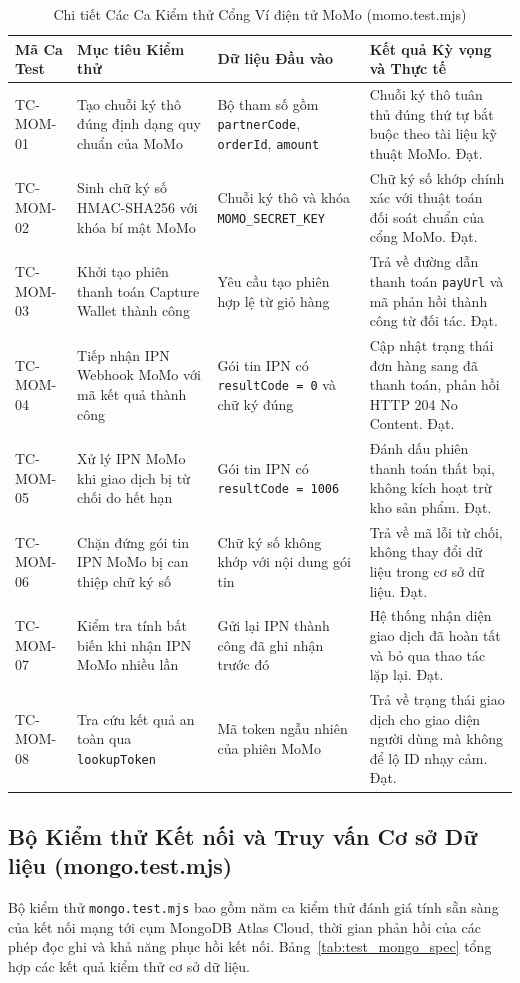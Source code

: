 \begin{table}[H]
\centering
\caption{Chi tiết Các Ca Kiểm thử Cổng Ví điện tử MoMo (momo.test.mjs)}
\label{tab:test_momo_spec}
\begin{tabularx}{\textwidth}{p{2cm}p{3.8cm}p{3cm}X}
\toprule
\textbf{Mã Ca Test} & \textbf{Mục tiêu Kiểm thử} & \textbf{Dữ liệu Đầu vào} & \textbf{Kết quả Kỳ vọng và Thực tế} \\
\midrule
TC-MOM-01 & Tạo chuỗi ký thô đúng định dạng quy chuẩn của MoMo & Bộ tham số gồm \texttt{partnerCode}, \texttt{orderId}, \texttt{amount} & Chuỗi ký thô tuân thủ đúng thứ tự bắt buộc theo tài liệu kỹ thuật MoMo. Đạt. \\
\addlinespace
TC-MOM-02 & Sinh chữ ký số HMAC-SHA256 với khóa bí mật MoMo & Chuỗi ký thô và khóa \texttt{MOMO\_SECRET\_KEY} & Chữ ký số khớp chính xác với thuật toán đối soát chuẩn của cổng MoMo. Đạt. \\
\addlinespace
TC-MOM-03 & Khởi tạo phiên thanh toán Capture Wallet thành công & Yêu cầu tạo phiên hợp lệ từ giỏ hàng & Trả về đường dẫn thanh toán \texttt{payUrl} và mã phản hồi thành công từ đối tác. Đạt. \\
\addlinespace
TC-MOM-04 & Tiếp nhận IPN Webhook MoMo với mã kết quả thành công & Gói tin IPN có \texttt{resultCode = 0} và chữ ký đúng & Cập nhật trạng thái đơn hàng sang đã thanh toán, phản hồi HTTP 204 No Content. Đạt. \\
\addlinespace
TC-MOM-05 & Xử lý IPN MoMo khi giao dịch bị từ chối do hết hạn & Gói tin IPN có \texttt{resultCode = 1006} & Đánh dấu phiên thanh toán thất bại, không kích hoạt trừ kho sản phẩm. Đạt. \\
\addlinespace
TC-MOM-06 & Chặn đứng gói tin IPN MoMo bị can thiệp chữ ký số & Chữ ký số không khớp với nội dung gói tin & Trả về mã lỗi từ chối, không thay đổi dữ liệu trong cơ sở dữ liệu. Đạt. \\
\addlinespace
TC-MOM-07 & Kiểm tra tính bất biến khi nhận IPN MoMo nhiều lần & Gửi lại IPN thành công đã ghi nhận trước đó & Hệ thống nhận diện giao dịch đã hoàn tất và bỏ qua thao tác lặp lại. Đạt. \\
\addlinespace
TC-MOM-08 & Tra cứu kết quả an toàn qua \texttt{lookupToken} & Mã token ngẫu nhiên của phiên MoMo & Trả về trạng thái giao dịch cho giao diện người dùng mà không để lộ ID nhạy cảm. Đạt. \\
\bottomrule
\end{tabularx}
\end{table}

\subsection{Bộ Kiểm thử Kết nối và Truy vấn Cơ sở Dữ liệu (mongo.test.mjs)}
Bộ kiểm thử \texttt{mongo.test.mjs} bao gồm năm ca kiểm thử đánh giá tính sẵn sàng của kết nối mạng tới cụm MongoDB Atlas Cloud, thời gian phản hồi của các phép đọc ghi và khả năng phục hồi kết nối. Bảng~\ref{tab:test_mongo_spec} tổng hợp các kết quả kiểm thử cơ sở dữ liệu.

